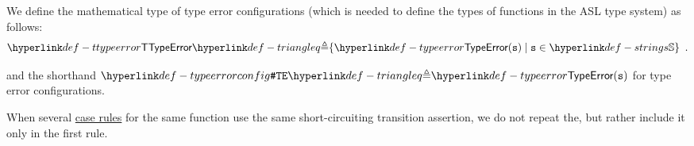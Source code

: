 We define the mathematical type of type error configurations
(which is needed to define the types of functions in the ASL type system)
as follows:
\hypertarget{def-ttypeerror}{}
\[
  \TTypeError \triangleq \{\TypeErrorVal{\vs} \;|\; \vs \in \Strings \} \enspace.
\]

\hypertarget{def-typeerrorconfig}{}
and the shorthand $\TypeErrorConfig \triangleq \TypeError(\vs)$ for type error configurations.

%
When several \hyperlink{def-caserules}{case rules} for the same function use the same short-circuiting transition assertion,
we do not repeat the\ProseOrTypeError, but rather include it only in the first rule.


